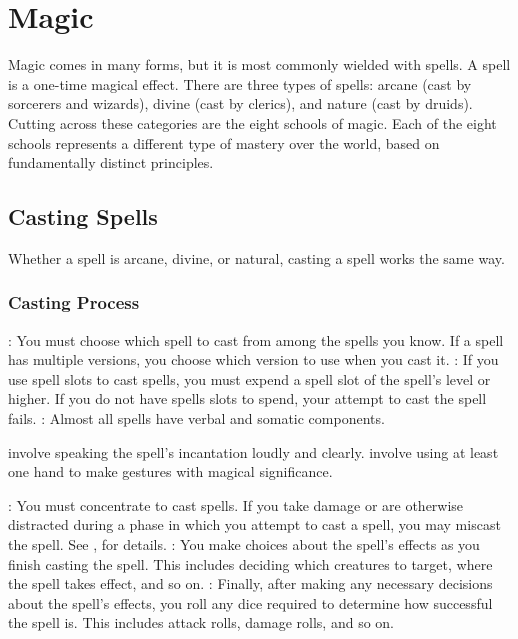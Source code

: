\chapter{Magic}\label{Magic}
Magic comes in many forms, but it is most commonly wielded with spells. A spell is a one-time magical effect. There are three types of spells: arcane (cast by sorcerers and wizards), divine (cast by clerics), and nature (cast by druids). Cutting across these categories are the eight schools of magic. Each of the eight schools represents a different type of mastery over the world, based on fundamentally distinct principles.

\section{Casting Spells}\label{Casting Spells}
Whether a spell is arcane, divine, or natural, casting a spell works the same way.

\subsection{Casting Process}

\begin{itemize}
    : You must choose which spell to cast from among the spells you know. If a spell has multiple versions, you choose which version to use when you cast it.
    : If you use spell slots to cast spells, you must expend a spell slot of the spell's level or higher. If you do not have spells slots to spend, your attempt to cast the spell fails.
    : Almost all spells have verbal and somatic components.
        \begin{itemize}
            \label{Verbal Components} involve speaking the spell's incantation loudly and clearly.
            \label{Somatic Components} involve using at least one hand to make gestures with magical significance.
        \end{itemize}
    : You must concentrate to cast spells. If you take damage or are otherwise distracted during a phase in which you attempt to cast a spell, you may miscast the spell. See , for details.
    : You make choices about the spell's effects as you finish casting the spell. This includes deciding which creatures to target, where the spell takes effect, and so on.
    : Finally, after making any necessary decisions about the spell's effects, you roll any dice required to determine how successful the spell is. This includes attack rolls, damage rolls, and so on.
\end{itemize}

